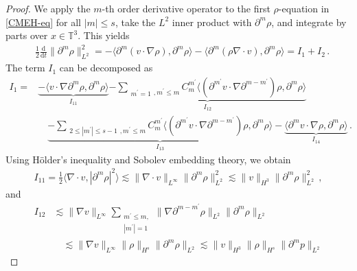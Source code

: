 \documentclass[reqno,11pt]{amsart}
\numberwithin{equation}{section}
\def\p{\partial}
\def\d{\mathrm{d}}
\begin{document}
\begin{proof}

We apply the $m$-th order derivative operator to the first $\rho$-equation in \eqref{CMEH-eq} for all $|m| \leq s$, take the $L^2$ inner product with $\partial^m \rho$, and integrate by parts over $x \in \mathbb{T}^3$. This yields
 \begin{equation}\label{rho-eq1}
	\begin{aligned}
		&\tfrac{1}{2} \tfrac{\d}{\d t} \|\partial^{m}\rho\|^{2}_{L^{2}}=-\langle \partial^{m}(v \cdot \nabla \rho),\p^m \rho \rangle-\langle\p^m(\rho\nabla\cdot v),\p^m \rho \rangle=I_1+I_2\,.
	\end{aligned}
\end{equation}
The term $I_1$ can be decomposed as
 \begin{equation}\label{rho-eq00}
	\begin{aligned}
		I_1=&\underset{I_{11}}{\underbrace{-\langle v\cdot\nabla\p^m\rho,\p^m\rho \rangle}}\underset{I_{12}}{\underbrace{ - \sum_{\substack{ m^{\prime}=1},m^{\prime}\leq m} C^{m^{\prime}}_{m} \langle (\p^{m^{\prime}} v \cdot \nabla \partial^{m-m^{\prime}}) \rho,\partial^{m} \rho \rangle}} \\
			&\quad \underset{I_{13}}{\underbrace{ - \sum_{\substack{ 2\leq |m^{\prime}|\leq s-1},m^{\prime}\leq m} C^{m^{\prime}}_{m} \langle (\p^{m^{\prime}} v \cdot \nabla \partial^{m-m^{\prime}}) \rho,\partial^{m} \rho \rangle}}- \underset{I_{14}}{\underbrace{ \langle\p^m v\cdot \nabla \rho,\p^m\rho \rangle}}
			\,.
	\end{aligned}
\end{equation}
Using Hölder's inequality and Sobolev embedding theory, we obtain
 \begin{equation}\label{rho-eqI11}
	\begin{aligned}
		I_{11}= \frac{1}{2}\langle \nabla \cdot v, |\partial^m \rho|^2 \rangle
        \lesssim \| \nabla \cdot v \|_{L^\infty} \| \partial^m \rho \|_{L^2}^2  \lesssim \| v \|_{H^3} \| \partial^m \rho \|_{L^2}^2
        \,,
	\end{aligned}
\end{equation}
and
\begin{equation}\label{rho-eqI12}
	\begin{aligned}
		I_{12} &\lesssim \| \nabla v \|_{L^\infty} \sum_{\substack{m^{\prime}\leq m, \\ |m^{\prime}| = 1}} \| \nabla \partial^{m -m^{\prime}} \rho \|_{L^2} \| \partial^m \rho \|_{L^2} \\
& \quad \lesssim \| \nabla v \|_{L^\infty} \| \rho \|_{H^s} \| \partial^m \rho \|_{L^2} \lesssim \| v \|_{H^3} \| \rho \|_{H^s} \| \partial^m p \|_{L^2}

\end{aligned}
\end{equation}
\end{proof}
\end{document}
